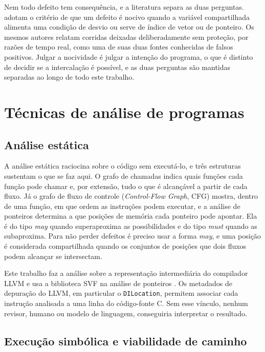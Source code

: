 Nem todo defeito tem consequência, e a literatura separa as duas perguntas.
 adotam o critério de que um defeito é nocivo quando a
variável compartilhada alimenta uma condição de desvio ou serve de índice de
vetor ou de ponteiro. Os mesmos autores relatam corridas deixadas
deliberadamente sem proteção, por razões de tempo real, como uma de suas duas
fontes conhecidas de falsos positivos. Julgar a nocividade é julgar a intenção do programa, o que
é distinto de decidir se a intercalação é possível, e as duas perguntas são
mantidas separadas ao longo de todo este trabalho.

\section{Técnicas de análise de programas}
\label{sec:tecnicas}

\subsection{Análise estática}

A análise estática raciocina sobre o código sem executá-lo, e três estruturas
sustentam o que se faz aqui. O grafo de chamadas indica quais funções cada
função pode chamar e, por extensão, tudo o que é alcançável a partir de cada
fluxo. Já o grafo de fluxo de controle (\textit{Control-Flow Graph}, CFG)
mostra, dentro de uma função, em que ordem as instruções podem executar, e a
análise de ponteiros determina a que posições de memória cada ponteiro pode
apontar. Ela é do
tipo \textit{may} quando superaproxima as possibilidades e do tipo \textit{must}
quando as subaproxima. Para não perder defeitos é preciso usar a forma
\textit{may}, e uma posição é considerada compartilhada quando os conjuntos de
posições que dois fluxos podem alcançar se intersectam.

Este trabalho faz a análise sobre a representação intermediária do compilador
LLVM \cite{llvm} e usa a biblioteca SVF na análise de ponteiros \cite{svf}. Os
metadados de depuração do LLVM, em particular o \texttt{DILocation}, permitem
associar cada instrução analisada a uma linha do código-fonte C. Sem esse
vínculo, nenhum revisor, humano ou modelo de linguagem, conseguiria interpretar
o resultado.

\subsection{Execução simbólica e viabilidade de caminho}

